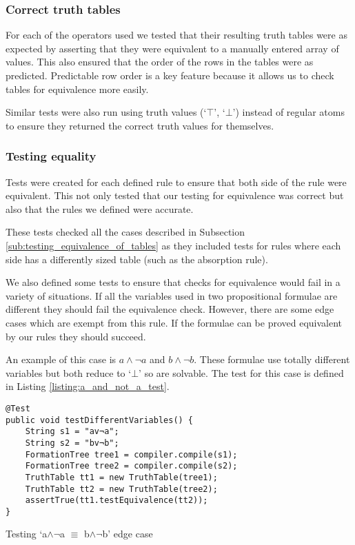 \documentclass{report}
\begin{document}
\subsubsection{Correct truth tables}

For each of the operators used we tested that their resulting truth tables were as expected by asserting that they were equivalent to a manually entered array of values. This also ensured that the order of the rows in the tables were as predicted. Predictable row order is a key feature because it allows us to check tables for equivalence more easily.

Similar tests were also run using truth values (`$\top$', `$\bot$') instead of regular atoms to ensure they returned the correct truth values for themselves.

\subsubsection{Testing equality}

Tests were created for each defined rule to ensure that both side of the rule were equivalent. This not only tested that our testing for equivalence was correct but also that the rules we defined were accurate.

These tests checked all the cases described in Subsection \ref{sub:testing_equivalence_of_tables} as they included tests for rules where each side has a differently sized table (such as the absorption rule).

We also defined some tests to ensure that checks for equivalence would fail in a variety of situations. If all the variables used in two propositional formulae are different they should fail the equivalence check. However, there are some edge cases which are exempt from this rule. If the formulae can be proved equivalent by our rules they should succeed. 

An example of this case is $a\land\lnot a$ and $b\land\lnot b$. These formulae use totally different variables but both reduce to `$\bot$' so are solvable. The test for this case is defined in Listing \ref{listing:a_and_not_a_test}.

\begin{listing}[ht]
\begin{verbatim}
@Test
public void testDifferentVariables() {
    String s1 = "av¬a";
    String s2 = "bv¬b";
    FormationTree tree1 = compiler.compile(s1);
    FormationTree tree2 = compiler.compile(s2);
    TruthTable tt1 = new TruthTable(tree1);
    TruthTable tt2 = new TruthTable(tree2);
    assertTrue(tt1.testEquivalence(tt2));
}
\end{verbatim}
\caption{Testing `a$\land\lnot$a $\equiv$ b$\land\lnot$b' edge case}
\label{listing:a_and_not_a_test}
\end{listing}
\end{document}
